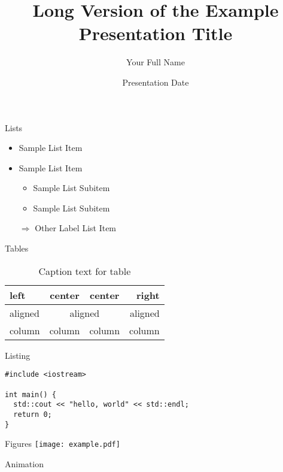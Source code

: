 \documentclass{beamer}
\title[Example Presentation]{Long Version of the Example Presentation Title}
\author[Short Name]{Your Full Name}
\institute{Technische Universität München}
\date{Presentation Date}
\begin{document}
\maketitle

\begin{frame}{Lists}
\begin{itemize}
	\item Sample List Item
	\item Sample List Item
	\begin{itemize}
		\item Sample List Subitem
		\item Sample List Subitem
	\end{itemize}
	
	\item[$\Rightarrow$] Other Label List Item
\end{itemize}
\end{frame}

\begin{frame}{Tables}
\centering
\begin{table}
\begin{tabular}{@{::}l|c|c|r@{::}}
	\hline 
	left & center & center & right \\ 
	\hline 
	aligned & \multicolumn{2}{c|}{aligned} & aligned \\ 
	\hline 
	column & column & column & column \\ 
	\hline 
\end{tabular}

\label{tab1}
\caption{Caption text for table} 
\end{table}
\end{frame}

\begin{frame}[fragile=singleslide]{Listing}
\begin{verbatim}
#include <iostream>

int main() {
  std::cout << "hello, world" << std::endl;
  return 0;
}
\end{verbatim}
\end{frame}

\begin{frame}{Figures}
\texttt{[image: example.pdf]}
\end{frame}

\begin{frame}{Animation}



\end{frame}
\end{document}
